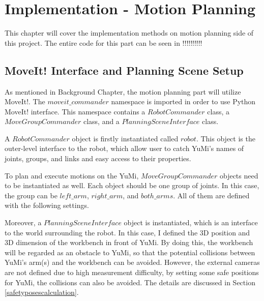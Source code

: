 \chapter{Implementation - Motion Planning}

This chapter will cover the implementation methods on motion planning side of this project. The entire code for this part can be seen in !!!!!!!!!!

\section{MoveIt! Interface and Planning Scene Setup}
As mentioned in Background Chapter, the motion planning part will utilize MoveIt!. The $moveit\_commander$ namespace is imported in order to use Python MoveIt! interface. This namespace contains a $RobotCommander$ class, a $MoveGroupCommander$ class, and a $PlanningSceneInterface$ class.

A $RobotCommander$ object is firstly instantiated called $robot$. This object is the outer-level interface to the robot, which allow user to catch YuMi's names of joints, groups, and links and easy access to their properties.

To plan and execute motions on the YuMi, $MoveGroupCommander$ objects need to be instantiated as well. Each object should be one group of joints. In this case, the group can be $left\_arm$, $right\_arm$, and $both\_arms$. All of them are defined with the following settings.

\begin{table}[H]
\centering
{}
\caption{Settings of three $MoveGroupCommander$ objects}
\label{armsetup}
\end{table}

Moreover, a $PlanningSceneInterface$ object is instantiated, which is an interface to the world surrounding the robot. In this case, I defined the 3D position and 3D dimension of the workbench in front of YuMi. By doing this, the workbench will be regarded as an obstacle to YuMi, so that the potential collisions between YuMi's arm(s) and the workbench can be avoided. However, the external cameras are not defined due to high measurement difficulty, by setting some safe positions for YuMi, the collisions can also be avoided. The details are discussed in Section \ref{safetyposescalculation}.

